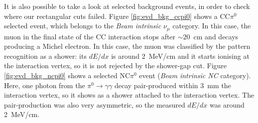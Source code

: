 It is also possible to take a look at selected background events, in order to check where our rectangular cuts failed. Figure \ref{fig:evd_bkg_ccpi0} shows a CC$\pi^0$ selected event, which belongs to the \emph{Beam intrinsic $\nu_{\mu}$} category. In this case, the muon in the final state of the CC interaction stops after $\sim20$~cm and decays producing a Michel electron. In this case, the muon was classified by the pattern recognition as a shower: its $dE/dx$ is around 2~MeV/cm and it starts ionising at the interaction vertex, so it is not rejected by the shower-gap cut. 
Figure \ref{fig:evd_bkg_ncpi0} shows a selected NC$\pi^0$ event (\emph{Beam intrinsic NC} category). Here, one photon from the $\pi^0\rightarrow\gamma\gamma$ decay pair-produced within 3~mm the interaction vertex, so it shows as a shower attached to the interaction vertex. The pair-production was also very asymmetric, so the measured $dE/dx$ was around 2~MeV/cm.

